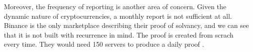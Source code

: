 Moreover, the frequency of reporting is another area of concern. Given the dynamic nature of cryptocurrencies, a monthly report is not sufficient at all.
Binance is the only marketplace describing their proof of solvancy, and we can see that it is not built with recurrence in mind.
The proof is created from scrach every time. They would need 150 servers to produce a daily proof \cite{BPS}.




 



